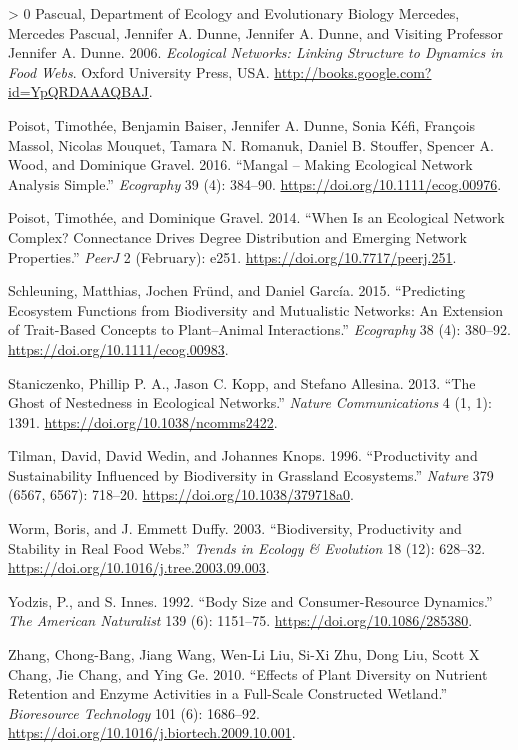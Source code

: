 \documentclass[11pt]{article}
\newlength{\cslhangindent}
\newenvironment{CSLReferences}[3] %
 {%
  \setlength{\parindent}{0pt}
  \ifodd #1 \everypar{\setlength{\hangindent}{\cslhangindent}}\ignorespaces\fi
  \ifnum #2 > 0
  \setlength{\parskip}{#2\baselineskip}
  \fi
 }%
 {}
\begin{document}
\begin{CSLReferences}{1}{0}
\leavevmode\hypertarget{ref-Pascual2006EcoNet}{}%
Pascual, Department of Ecology and Evolutionary Biology Mercedes,
Mercedes Pascual, Jennifer A. Dunne, Jennifer A. Dunne, and Visiting
Professor Jennifer A. Dunne. 2006. \emph{Ecological Networks: Linking
Structure to Dynamics in Food Webs}. Oxford University Press, USA.
\url{http://books.google.com?id=YpQRDAAAQBAJ}.

\leavevmode\hypertarget{ref-Poisot2016ManMak}{}%
Poisot, Timothée, Benjamin Baiser, Jennifer A. Dunne, Sonia Kéfi,
François Massol, Nicolas Mouquet, Tamara N. Romanuk, Daniel B. Stouffer,
Spencer A. Wood, and Dominique Gravel. 2016. {``Mangal -- Making
Ecological Network Analysis Simple.''} \emph{Ecography} 39 (4): 384--90.
\url{https://doi.org/10.1111/ecog.00976}.

\leavevmode\hypertarget{ref-Poisot2014WheEco}{}%
Poisot, Timothée, and Dominique Gravel. 2014. {``When Is an Ecological
Network Complex? Connectance Drives Degree Distribution and Emerging
Network Properties.''} \emph{PeerJ} 2 (February): e251.
\url{https://doi.org/10.7717/peerj.251}.

\leavevmode\hypertarget{ref-Schleuning2015PreEco}{}%
Schleuning, Matthias, Jochen Fründ, and Daniel García. 2015.
{``Predicting Ecosystem Functions from Biodiversity and Mutualistic
Networks: An Extension of Trait-Based Concepts to Plant--Animal
Interactions.''} \emph{Ecography} 38 (4): 380--92.
\url{https://doi.org/10.1111/ecog.00983}.

\leavevmode\hypertarget{ref-Staniczenko2013GhoNesa}{}%
Staniczenko, Phillip P. A., Jason C. Kopp, and Stefano Allesina. 2013.
{``The Ghost of Nestedness in Ecological Networks.''} \emph{Nature
Communications} 4 (1, 1): 1391.
\url{https://doi.org/10.1038/ncomms2422}.

\leavevmode\hypertarget{ref-Tilman1996ProSus}{}%
Tilman, David, David Wedin, and Johannes Knops. 1996. {``Productivity
and Sustainability Influenced by Biodiversity in Grassland
Ecosystems.''} \emph{Nature} 379 (6567, 6567): 718--20.
\url{https://doi.org/10.1038/379718a0}.

\leavevmode\hypertarget{ref-Worm2003BioPro}{}%
Worm, Boris, and J. Emmett Duffy. 2003. {``Biodiversity, Productivity
and Stability in Real Food Webs.''} \emph{Trends in Ecology \&
Evolution} 18 (12): 628--32.
\url{https://doi.org/10.1016/j.tree.2003.09.003}.

\leavevmode\hypertarget{ref-Yodzis1992BodSiz}{}%
Yodzis, P., and S. Innes. 1992. {``Body Size and Consumer-Resource
Dynamics.''} \emph{The American Naturalist} 139 (6): 1151--75.
\url{https://doi.org/10.1086/285380}.

\leavevmode\hypertarget{ref-Zhang2010EffPla}{}%
Zhang, Chong-Bang, Jiang Wang, Wen-Li Liu, Si-Xi Zhu, Dong Liu, Scott X
Chang, Jie Chang, and Ying Ge. 2010. {``Effects of Plant Diversity on
Nutrient Retention and Enzyme Activities in a Full-Scale Constructed
Wetland.''} \emph{Bioresource Technology} 101 (6): 1686--92.
\url{https://doi.org/10.1016/j.biortech.2009.10.001}.

\end{CSLReferences}
\end{document}
